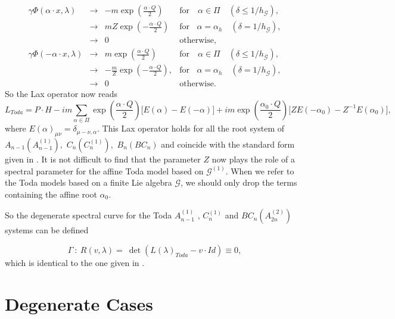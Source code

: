 \documentclass[a4paper,12pt]{article}
\begin{document}
\begin{equation}
\begin{array}{llll}
\gamma \Phi (\alpha \cdot x,\lambda ) & \rightarrow & -m\exp ({\frac{{\alpha
\cdot Q}}{{2}}}) & \mbox{for}\quad \alpha \in \Pi \quad (\delta \leq 1/h_{
\mathcal{G}}), \\
& \rightarrow & {mZ}\exp (-{\frac{{\alpha \cdot Q}}{{2}}}) &
\mbox{for}\ \ \
\ \alpha =\alpha _{h}\quad (\delta =1/h_{\mathcal{G}}), \\
& \rightarrow & 0 & \mbox{otherwise}, \\
\gamma \Phi (-\alpha \cdot x,\lambda ) & \rightarrow & m\exp ({\frac{{\alpha
\cdot Q}}{{2}}}) & \mbox{for}\quad \alpha \in \Pi \quad (\delta \leq 1/h_{
\mathcal{G}}), \\
& \rightarrow & -{\frac{m}{Z}}\exp (-{\frac{{\alpha \cdot
Q}}{{2}}}), &
\mbox{for}\ \ \ \ \alpha =\alpha _{h}\quad (\delta =1/h_{\mathcal{G}}), \\
& \rightarrow & 0 & \mbox{otherwise}.
\end{array}
\end{equation}
So the Lax operator now reads
\begin{equation}
L_{\mathit{Toda}}=P\cdot H-im\sum_{\alpha \in \Pi }\exp
({\frac{{\alpha
\cdot Q}}{2}})\lbrack E(\alpha )-E(-\alpha )\rbrack +im\exp ({\frac{{\alpha
_{0}\cdot Q}}{2}})\lbrack ZE(-\alpha _{0})-Z^{-1}E(\alpha _{0})\rbrack ,
\label{todalax}
\end{equation}
where $E(\alpha )_{\mu \nu }=\delta _{\mu -\nu ,\alpha }$.
This Lax operator holds for all the root system of
$A_{n-1}(A_{n-1}^{(1)}),$ $C_{n}(C_{n}^{(1)}),$ $B_n(BC_{n})$ and coincide with the standard
form given in \cite{op}. It is not difficult to find that
the parameter $Z$ now plays the role of a spectral parameter
for the affine Toda model based on ${\mathcal{G}}^{(1)}$.
When we refer to the Toda models based on a finite Lie
algebra $\mathcal{G}$, we should only drop the terms
containing the affine root $\alpha _{0}$.

So the degenerate spectral curve for the  Toda $A_{n-1}^{(1)}$
, $C_{n}^{(1)}$ and  $BC_{n}(A_{2n}^{(2)})$ systems can be
defined

\begin{equation}
\Gamma \ :\ R(v,\lambda )=~\det (L(\lambda )_{\mathit{Toda}}-v\cdot
Id)\equiv 0,
\end{equation}
which is identical to the one given in \cite{Martin,Taka}.

\section{Degenerate Cases}
\end{document}
